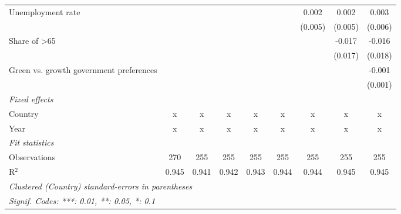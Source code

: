 \begin{table}[htbp]
\begin{tabular}{lcccccccc}
      Unemployment rate                                          &         &         &         &         &         & 0.002   & 0.002   & 0.003\\   
                                                                 &         &         &         &         &         & (0.005) & (0.005) & (0.006)\\   
      Share of >65                                               &         &         &         &         &         &         & -0.017  & -0.016\\   
                                                                 &         &         &         &         &         &         & (0.017) & (0.018)\\   
      Green vs. growth government preferences                    &         &         &         &         &         &         &         & -0.001\\   
                                                                 &         &         &         &         &         &         &         & (0.001)\\   
      \emph{Fixed effects}\\
      Country                                                    & x       & x       & x       & x       & x       & x       & x       & x\\  
      Year                                                       & x       & x       & x       & x       & x       & x       & x       & x\\  
      \midrule \emph{Fit statistics}\\
      Observations                                               & 270     & 255     & 255     & 255     & 255     & 255     & 255     & 255\\  
      R$^2$                                                      & 0.945   & 0.941   & 0.942   & 0.943   & 0.944   & 0.944   & 0.945   & 0.945\\  
      \midrule
      \multicolumn{9}{l}{\emph{Clustered (Country) standard-errors in parentheses}}\\
      \multicolumn{9}{l}{\emph{Signif. Codes: ***: 0.01, **: 0.05, *: 0.1}}\\
   \end{tabular}
\end{table}


